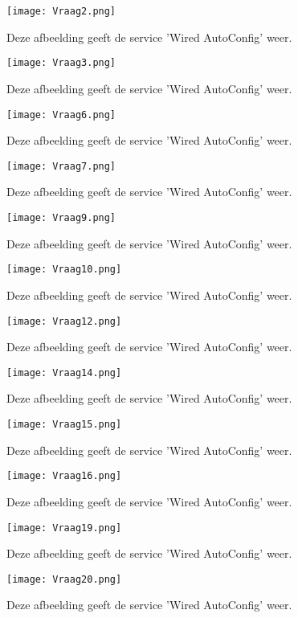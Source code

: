 \begin{figure}[H]
	\centering
	\texttt{[image: Vraag2.png]}
	\caption{Deze afbeelding geeft de service 'Wired AutoConfig' weer.}
\end{figure}

\begin{figure}[H]
	\centering
	\texttt{[image: Vraag3.png]}
	\caption{Deze afbeelding geeft de service 'Wired AutoConfig' weer.}
\end{figure}

\begin{figure}[H]
	\centering
	\texttt{[image: Vraag6.png]}
	\caption{Deze afbeelding geeft de service 'Wired AutoConfig' weer.}
\end{figure}

\begin{figure}[H]
	\centering
	\texttt{[image: Vraag7.png]}
	\caption{Deze afbeelding geeft de service 'Wired AutoConfig' weer.}
\end{figure}

\begin{figure}[H]
	\centering
	\texttt{[image: Vraag9.png]}
	\caption{Deze afbeelding geeft de service 'Wired AutoConfig' weer.}
\end{figure}

\begin{figure}[H]
	\centering
	\texttt{[image: Vraag10.png]}
	\caption{Deze afbeelding geeft de service 'Wired AutoConfig' weer.}
\end{figure}

\begin{figure}[H]
	\centering
	\texttt{[image: Vraag12.png]}
	\caption{Deze afbeelding geeft de service 'Wired AutoConfig' weer.}
\end{figure}
\begin{figure}[H]
	\centering
	\texttt{[image: Vraag14.png]}
	\caption{Deze afbeelding geeft de service 'Wired AutoConfig' weer.}
\end{figure}
\begin{figure}[H]
	\centering
	\texttt{[image: Vraag15.png]}
	\caption{Deze afbeelding geeft de service 'Wired AutoConfig' weer.}
\end{figure}
\begin{figure}[H]
	\centering
	\texttt{[image: Vraag16.png]}
	\caption{Deze afbeelding geeft de service 'Wired AutoConfig' weer.}
\end{figure}
\begin{figure}[H]
	\centering
	\texttt{[image: Vraag19.png]}
	\caption{Deze afbeelding geeft de service 'Wired AutoConfig' weer.}
\end{figure}
\begin{figure}[H]
	\centering
	\texttt{[image: Vraag20.png]}
	\caption{Deze afbeelding geeft de service 'Wired AutoConfig' weer.}
\end{figure}
